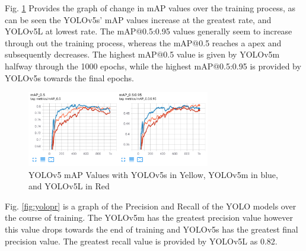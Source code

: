\documentclass[conference]{IEEEtran}
\begin{document}
 Fig. \ref{fig:YoloMapValues} Provides the graph of change in mAP values over the training process, as can be seen the YOLOv5s' mAP values increase at the greatest rate, and YOLOv5L at lowest rate. The mAP@0.5:0.95 values generally seem to increase through out the training process, whereas the mAP@0.5 reaches a apex and subsequently decreases. The highest mAP@0.5 value is given by YOLOv5m halfway through the 1000 epochs, while the highest mAP@0.5:0.95 is provided by YOLOv5s towards the final epochs.
  
\begin{figure}[H]
    \centering
    \includegraphics[width=8cm]{Images/yolomaps.png}
    \caption{YOLOv5 mAP Values with YOLOv5s in Yellow, YOLOv5m in blue, and YOLOv5L in Red}
    \label{fig:YoloMapValues}
\end{figure}

Fig. \ref{fig:yolopr} is a graph of the Precision and Recall of the YOLO models over the course of training. The YOLOv5m has the greatest precision value however this value drops towards the end of training and YOLOv5s has the greatest final precision value. The greatest recall value is provided by YOLOv5L as 0.82.
\end{document}
